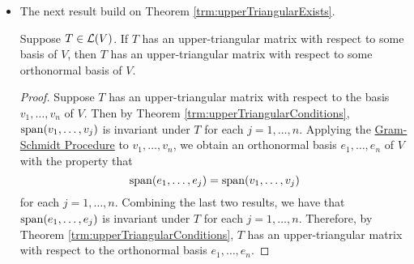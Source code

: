 \documentclass[../main.tex]{subfiles}
\begin{document}
\begin{itemize}
\begin{theorem}
        Suppose $V$ is finite-dimensional. Then every orthonormal list of vectors in $V$ can be extended to an orthonormal basis of $V$.
        \begin{proof}
            Suppose $e_1,\dots,e_m$ is an orthonormal list of vectors in $V$. Then by Theorem \ref{trm:orthonormalLnlIndep}, $e_1,\dots,e_m$ is linearly independent. Hence this list can be extended to a basis $e_1,\dots,e_m,v_1,\dots,v_n$ of $V$ by Theorem \ref{trm:lnlIndependentExtendBasis}. Applying the \hyperref[trm:GramSchmidt]{Gram-Schmidt Procedure} to this basis yields an orthonormal list $e_1,\dots,e_m,f_1,\dots,f_n$ of vectors in $V$. Note that the \hyperref[trm:GramSchmidt]{Gram-Schmidt Procedure} doesn't change the first $m$ vectors of the list: If $1\leq j\leq m$, then
            \begin{align*}
                e_j' &= \frac{e_j-\inp{e_j}{e_1}e_1-\cdots-\inp{e_j}{e_{j-1}}e_{j-1}}{\norm{e_j-\inp{e_j}{e_1}e_1-\cdots-\inp{e_j}{e_{j-1}}e_{j-1}}}\\
                &= \frac{e_j}{\norm{e_j}}\\
                &= e_j
            \end{align*}
            Lastly, by Theorem \ref{trm:dimOrthonormal}, we know that $e_1,\dots,e_m,f_1,\dots,f_n$ is a basis of $V$.
        \end{proof}
    \end{theorem}
    \item The next result build on Theorem \ref{trm:upperTriangularExists}.
    \begin{theorem}\label{trm:upperTriangularOrthonormal}
        Suppose $T\in\mathcal{L}(V)$. If $T$ has an upper-triangular matrix with respect to some basis of $V$, then $T$ has an upper-triangular matrix with respect to some orthonormal basis of $V$.
        \begin{proof}
            Suppose $T$ has an upper-triangular matrix with respect to the basis $v_1,\dots,v_n$ of $V$. Then by Theorem \ref{trm:upperTriangularConditions}, $\operatorname{span}(v_1,\dots,v_j)$ is invariant under $T$ for each $j=1,\dots,n$. Applying the \hyperref[trm:GramSchmidt]{Gram-Schmidt Procedure} to $v_1,\dots,v_n$, we obtain an orthonormal basis $e_1,\dots,e_n$ of $V$ with the property that
            \begin{equation*}
                \operatorname{span}(e_1,\dots,e_j) = \operatorname{span}(v_1,\dots,v_j)
            \end{equation*}
            for each $j=1,\dots,n$. Combining the last two results, we have that $\operatorname{span}(e_1,\dots,e_j)$ is invariant under $T$ for each $j=1,\dots,n$. Therefore, by Theorem \ref{trm:upperTriangularConditions}, $T$ has an upper-triangular matrix with respect to the orthonormal basis $e_1,\dots,e_n$.

\end{proof}
\end{theorem}
\end{itemize}
\end{document}
